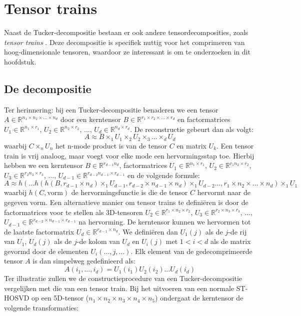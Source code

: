 \section{Tensor trains}

Naast de Tucker-decompositie bestaan er ook andere tensordecomposities, zoals \textit{tensor trains} \cite{ref:tensor_trains}. Deze decompositie is specifiek nuttig voor het comprimeren van hoog-dimensionale tensoren, waardoor ze interessant is om te onderzoeken in dit hoofdstuk.

\subsection{De decompositie}

Ter herinnering: bij een Tucker-decompositie benaderen we een tensor $A \in \mathbb{R}^{n_1 \times n_2 \times \dots \times n_d}$ door een kerntensor $B \in \mathbb{R}^{r_1 \times r_2 \times \dots \times r_d}$ en factormatrices $U_1 \in \mathbb{R}^{n_1 \times r_1}$, $U_2 \in \mathbb{R}^{n_2 \times r_2}$, $\dots$, $U_d \in \mathbb{R}^{n_d \times r_d}$. De reconstructie gebeurt dan als volgt:
\[
A \approx B \times_1 U_1 \times_2 U_2 \times_3 \dots \times_d U_d
\]
waarbij $C \times_n U_n$ het n-mode product is van de tensor $C$ en matrix $U_k$. Een tensor train is vrij analoog, maar voegt voor elke mode een hervormingsstap toe. Hierbij hebben we een kerntensor $B \in \mathbb{R}^{r_{d-1} n_d}$, factormatrices $U_1 \in \mathbb{R}^{n_1 \times r_1}$, $U_2 \in \mathbb{R}^{r_1 n_2 \times r_2}$, $U_3 \in \mathbb{R}^{r_2 n_3 \times r_3}$, $\dots$, $U_{d-1} \in \mathbb{R}^{r_{d-2} n_{d-1} \times r_{d-1}}$ en de volgende formule:
\[
A \approx h(\dots h(h(B, r_{d-1} \times n_d) \times_1 U_{d-1}, r_{d-2} \times n_{d-1} \times n_d) \times_1 U_{d-2} \dots, r_1 \times n_2 \times \dots \times n_d) \times_1 U_1
\]
waarbij $h(C, \text{vorm})$ de hervormingsfunctie is die de tensor $C$ hervormt naar de gegeven vorm. Een alternatieve manier om tensor trains te defini\"eren is door de factormatrices voor te stellen als 3D-tensoren $U_2 \in \mathbb{R}^{r_1 \times n_2 \times r_2}$, $U_3 \in \mathbb{R}^{r_2 \times n_3 \times r_3}$, $\dots$, $U_{d-1} \in \mathbb{R}^{r_{d-2} \times n_{d-1} \times r_{d-1}}$ na hervorming. De kerntensor kunnen we hervormen tot de laatste factormatrix $U_d \in \mathbb{R}^{r_{d-1} \times n_d}$. We defini\"eren dan $U_1(j)$ als de $j$-de rij van $U_1$, $U_d(j)$ als de $j$-de kolom van $U_d$ en $U_i(j)$ met $1 < i < d$ als de matrix gevormd door de elementen $U_i(\dots, j, \dots)$. Elk element van de gedecomprimeerde tensor $A$ is dan simpelweg gedefinieerd als: 
\[
A(i_1, \dots, i_d) = U_1(i_1) U_2(i_2) \dots U_d(i_d)
\]
Ter illustratie zullen we de constructieprocedure van een Tucker-decompositie vergelijken met die van een tensor train. Bij het uitvoeren van een normale ST-HOSVD op een 5D-tensor ($n_1 \times n_2 \times n_3 \times n_4 \times n_5$) ondergaat de kerntensor de volgende transformaties:

